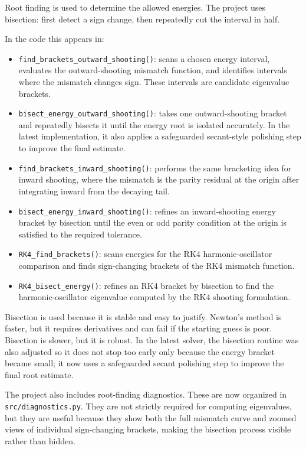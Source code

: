 \documentclass[11pt]{article}
\begin{document}
    Root finding is used to determine the allowed energies. The project uses bisection: first detect a sign change, then repeatedly cut the interval in half.

    In the code this appears in:
    \begin{itemize}
        \item \texttt{find\_brackets\_outward\_shooting()}: scans a chosen energy interval, evaluates the outward-shooting mismatch function, and identifies intervals where the mismatch changes sign. These intervals are candidate eigenvalue brackets.
        \item \texttt{bisect\_energy\_outward\_shooting()}: takes one outward-shooting bracket and repeatedly bisects it until the energy root is isolated accurately. In the latest implementation, it also applies a safeguarded secant-style polishing step to improve the final estimate.
        \item \texttt{find\_brackets\_inward\_shooting()}: performs the same bracketing idea for inward shooting, where the mismatch is the parity residual at the origin after integrating inward from the decaying tail.
        \item \texttt{bisect\_energy\_inward\_shooting()}: refines an inward-shooting energy bracket by bisection until the even or odd parity condition at the origin is satisfied to the required tolerance.
        \item \texttt{RK4\_find\_brackets()}: scans energies for the RK4 harmonic-oscillator comparison and finds sign-changing brackets of the RK4 mismatch function.
        \item \texttt{RK4\_bisect\_energy()}: refines an RK4 bracket by bisection to find the harmonic-oscillator eigenvalue computed by the RK4 shooting formulation.
    \end{itemize}

    Bisection is used because it is stable and easy to justify. Newton's method is faster, but it requires derivatives and can fail if the starting guess is poor. Bisection is slower, but it is robust. In the latest solver, the bisection routine was also adjusted so it does not stop too early only because the energy bracket became small; it now uses a safeguarded secant polishing step to improve the final root estimate.

    The project also includes root-finding diagnostics. These are now organized in \texttt{src/diagnostics.py}. They are not strictly required for computing eigenvalues, but they are useful because they show both the full mismatch curve and zoomed views of individual sign-changing brackets, making the bisection process visible rather than hidden.
\end{document}

